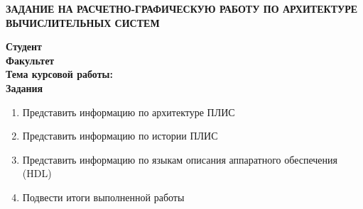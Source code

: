 {
\thispagestyle{empty}
\begin{center}
\MakeTextUppercase{\institutionName}

\begin{spacing}{1.3}
\textbf{\fontsize{16pt}{18pt}\selectfont\MakeTextUppercase{Задание на расчетно-графическую работу по архитектуре вычислительных систем}}
\end{spacing}
\end{center}

\noindent
{\textbf{Студент}\quad{{\docAuthorExactSurname} {\docAuthorExactName} {\docAuthorExactFathername}}}\\
{\textbf{Факультет}\quad{\faculty}}\\
{\textbf{Тема курсовой работы:}\quad{\docTitle}}\\

\textbf{Задания}
\begin{enumerate}
\item Представить информацию по архитектуре ПЛИС
\item Представить информацию по истории ПЛИС
\item Представить информацию по языкам описания аппаратного обеспечения (HDL)
\item Подвести итоги выполненной работы
\end{enumerate}
\vfill
\hfill\parbox{8cm}{
\textbf{}

{}
}
\newpage
}